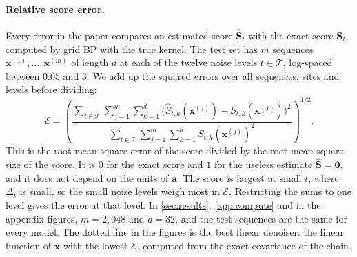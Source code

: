 \documentclass{article}
\begin{document}
\paragraph{Relative score error.} Every error in the paper compares an estimated score $\widehat{\mathbf S}_t$ with
the exact score $\mathbf S_t$, computed by grid BP with the true kernel. The test set has $m$ sequences
$\mathbf x^{(1)},\ldots,\mathbf x^{(m)}$ of length $d$ at each of the twelve noise levels $t\in\mathcal T$, log-spaced
between $0.05$ and $3$. We add up the squared errors over all sequences, sites and levels before dividing:
\begin{equation}
  \mathcal E
  =\left(
  \frac{\sum_{t\in\mathcal T}\sum_{j=1}^{m}\sum_{k=1}^{d}
        \big(\widehat S_{t,k}(\mathbf x^{(j)})-S_{t,k}(\mathbf x^{(j)})\big)^2}
       {\sum_{t\in\mathcal T}\sum_{j=1}^{m}\sum_{k=1}^{d}
        S_{t,k}(\mathbf x^{(j)})^2}
  \right)^{1/2}.
  \label{eq:rel-error}
\end{equation}
This is the root-mean-square error of the score divided by the root-mean-square size of the score. It is $0$ for the
exact score and $1$ for the useless estimate $\widehat{\mathbf S}=\mathbf 0$, and it does not depend on the units of
$\mathbf a$. The score is largest at small $t$, where $\Delta_t$ is small, so the small noise levels weigh most in
$\mathcal E$. Restricting the sums to one level gives the error at that level. In \cref{sec:results}, \cref{app:compute} and in
the appendix figures, $m=2{,}048$ and $d=32$, and the test sequences are the same for every model. The dotted line in
the figures is the best linear denoiser: the linear function of $\mathbf x$ with the lowest $\mathcal E$, computed from
the exact covariance of the chain.
\end{document}
